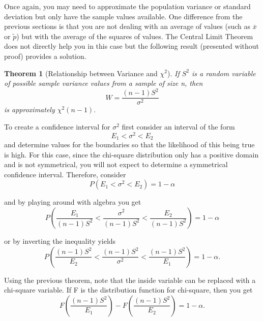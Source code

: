 \documentclass[10pt,]{book}
\theoremstyle{plain}
\newtheorem{theorem}{Theorem}[section]
\theoremstyle{definition}
\theoremstyle{definition}
\theoremstyle{definition}
\numberwithin{equation}{section}
\newcommand{\lt}{ < }
\begin{document}
Once again, you may need to approximate the population variance or standard deviation but only have the sample values available. One difference from the previous sections is that you are not dealing with an average of values (such as \(\overline{x}\) or \(\tilde{p}\)) but with the average of the squares of values. The Central Limit Theorem does not directly help you in this case but the following result (presented without proof) provides a solution.
%
\begin{theorem}[{Relationship between Variance and \(\chi ^2\)}]\label{theorem-71}
If \(S^2\) is a random variable of possible sample variance values from a sample of size n, then
\begin{equation*}W = \frac{(n-1)S^2}{\sigma^2}\end{equation*}
is approximately \(\chi ^2(n-1).\)
%
\end{theorem}
\par

To create a confidence interval for \(\sigma^2\) first consider an interval of the form
\begin{equation*}E_1 \lt \sigma^2 \lt E_2\end{equation*}
and determine values for the boundaries so that the likelihood of this being true is high. For this case, since the chi-square distribution only has a positive domain and is not symmetrical, you will not expect to determine a symmetrical confidence interval.  Therefore, consider
\begin{equation*}P (E_1 \lt \sigma^2 \lt E_2 ) = 1 - \alpha \end{equation*} 

and by playing around with algebra you get
\begin{equation*}P \left ( \frac{E_1}{(n-1)S^2} \lt \frac{\sigma^2}{(n-1)S^2} \lt \frac{E_2}{(n-1)S^2} \right ) = 1 - \alpha \end{equation*} 

or by inverting the inequality yields
\begin{equation*}P \left ( \frac{(n-1)S^2}{E_2} \lt \frac{(n-1)S^2}{\sigma^2} \lt \frac{(n-1)S^2}{E_1} \right ) = 1 - \alpha .\end{equation*} 

Using the previous theorem, note that the inside variable can be replaced with a chi-square variable. If F is the distribution function for chi-square, then you get
\begin{equation*}F \left ( \frac{(n-1)S^2}{E_1} \right ) - F \left ( \frac{(n-1)S^2}{E_2} \right ) = 1 - \alpha .\end{equation*} 
\end{document}
